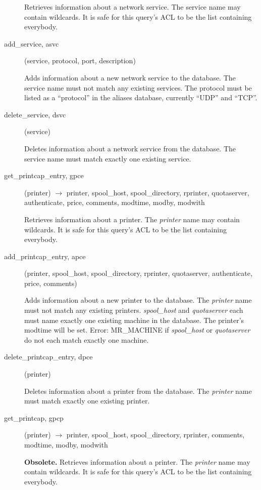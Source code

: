 \documentclass{article}
\begin{document}
\begin{description}
Retrieves information about a network service.  The service name may
contain wildcards.  It is safe for this query's ACL to be the list
containing everybody.

\item[add\_service, asvc](service, protocol, port, description)

Adds information about a new network service to the database.  The
service name must not match any existing services.  The protocol must
be listed as a ``protocol'' in the aliases database, currently ``UDP'' and
``TCP''.

\item[delete\_service, dsvc](service)

Deletes information about a network service from the database.  The
service name must match exactly one existing service.

\item[get\_printcap\_entry, gpce](printer) $\rightarrow$ printer, spool\_host,
spool\_directory, rprinter, quotaserver, authenticate, price, comments,
modtime, modby, modwith

Retrieves information about a printer.  The {\em printer} name may
contain wildcards.  It is safe for this query's ACL to be the list
containing everybody.

\item[add\_printcap\_entry, apce](printer, spool\_host, spool\_directory,
rprinter, quotaserver, authenticate, price, comments)

Adds information about a new printer to the database.  The {\em printer}
name must not match any existing printers.  {\em spool\_host} and
{\em quotaserver} each must name exactly one existing machine in the
database.  The printer's modtime will be set.  Error: MR\_MACHINE if
{\em spool\_host} or {\em quotaserver} do not each match exactly one
machine.

\item[delete\_printcap\_entry, dpce](printer)

Deletes information about a printer from the database.  The
{\em printer} name must match exactly one existing printer.

\item[get\_printcap, gpcp](printer) $\rightarrow$ printer, spool\_host,
spool\_directory, rprinter, comments, modtime, modby, modwith

{\bf Obsolete.}
Retrieves information about a printer.  The {\em printer} name may
contain wildcards.  It is safe for this query's ACL to be the list
containing everybody.


\end{description}
\end{document}
